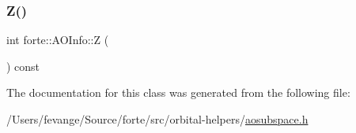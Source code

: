 \mbox{\label{classforte_1_1_a_o_info_ac71668d14738a2054f33d8da68fbf0bc}} 
\subsubsection{\texorpdfstring{Z()}{Z()}}
{\footnotesize\ttfamily int forte\+::\+A\+O\+Info\+::Z (\begin{DoxyParamCaption}{ }\end{DoxyParamCaption}) const\hspace{0.3cm}{\ttfamily [inline]}}



The documentation for this class was generated from the following file\+:\begin{DoxyCompactItemize}
\item 
/\+Users/fevange/\+Source/forte/src/orbital-\/helpers/\mbox{\hyperlink{aosubspace_8h}{aosubspace.\+h}}\end{DoxyCompactItemize}
